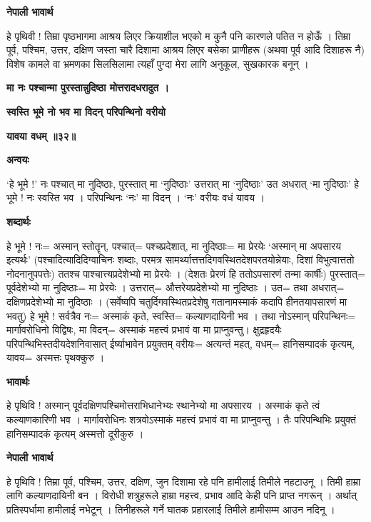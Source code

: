 \documentclass[11pt, a5paper]{article}
\begin{document}
\textbf{नेपाली भावार्थ}

हे पृथिवी ! तिम्रा पृष्ठभागमा आश्रय लिएर क्रियाशील भएको म कुनै पनि कारणले पतित न होऊँ । तिम्रा पूर्व, पश्चिम, उत्तर, दक्षिण जस्ता चारै दिशामा आश्रय लिएर बसेका प्राणीहरू (अथवा पूर्व आदि दिशाहरू नै) विशेष कामले वा भ्रमणका सिलसिलामा त्यहाँ पुग्दा मेरा लागि अनुकूल, सुखकारक बनून् ।

\textbf{मा नः पश्चान्मा पुरस्तान्नुदिष्ठा मोत्तरादधरादुत ।}

\textbf{स्वस्ति भूमे नो भव मा विदन् परिपन्थिनो वरीयो}

\textbf{यावया वधम् ॥३२॥}

\textbf{अन्वयः}

‘हे भूमे !’ नः पश्चात् मा नुदिष्ठाः, पुरस्तात् मा ‘नुदिष्ठाः’ उत्तरात् मा ‘नुदिष्ठाः’ उत अधरात् ‘मा नुदिष्ठाः’ हे भूमे ! नः स्वस्ति भव । परिपन्थिनः ‘नः’ मा विदन् । ‘नः’ वरीयः वधं यावय ।

\textbf{शब्दार्थः}

हे भूमे ! नः= अस्मान् स्तोतॄन्, पश्चात्= पश्चप्रदेशात्, मा नुदिष्ठाः= मा प्रेरयेः ‘अस्मान् मा अपसारय इत्यर्थः’ (पश्चादित्यादिदिग्वाचिनः शब्दाः, परमत्र सामर्थ्यात्तत्तदिगवस्थितदेशपरतयोन्नेयाः,  दिशां विभुत्वात्ततो नोदनानुपपत्तेः) ततश्च पाश्चात्त्यप्रदेशेभ्यो मा प्रेरयेः । (देशतः प्रेरणं हि ततोऽपसारणं तन्मा कार्षीः) पुरस्तात्= पूर्वदेशेभ्यो मा नुदिष्ठाः= मा प्रेरयेः । उत्तरात्= औत्तरेयप्रदेशेभ्यो मा नुदिष्ठाः । उत= तथा अधरात्= दक्षिणप्रदेशेभ्यो मा नुदिष्ठाः । (सर्वेष्वपि चतुर्दिगवस्थितप्रदेशेषु गतानामस्माकं कदापि हीनतयापसारणं मा भवतु) हे भूमे ! सर्वत्रैव नः= अस्माकं कृते, स्वस्ति= कल्याणदायिनी भव । तथा नोऽस्मान् परिपन्थिनः= मार्गावरोधिनो विद्विषः, मा विदन्= अस्माकं महत्त्वं प्रभावं वा मा प्राप्नुवन्तु। क्षुद्रहृदयैः परिपन्थिभिस्तदीयदेशनिवासात् ईर्ष्याभावेन प्रयुक्तम् वरीयः= अत्यन्तं महत्, वधम्= हानिसम्पादकं कृत्यम्, यावय= अस्मत्तः पृथक्‍कुरु ।

\textbf{भावार्थः}

हे पृथिवि ! अस्मान् पूर्वदक्षिणपश्चिमोत्तराभिधानेभ्यः स्थानेभ्यो मा अपसारय । अस्माकं कृते त्वं कल्याणकारिणी भव । मार्गावरोधिनः शत्रवोऽस्माकं महत्त्वं प्रभावं वा मा प्राप्नुवन्तु । तैः परिपन्थिभिः प्रयुक्तं हानिसम्पादकं कृत्यम् अस्मत्तो दूरीकुरु ।

\textbf{नेपाली भावार्थ}

हे पृथिवि ! तिम्रा पूर्व, पश्चिम, उत्तर, दक्षिण, जुन दिशामा रहे पनि हामीलाई तिमीले नहटाउनू । तिमी हाम्रा लागि कल्याणदायिनी बन । विरोधी शत्रुहरूले हाम्रा महत्त्व, प्रभाव आदि केही पनि प्राप्त नगरून् । अर्थात् प्रतिस्पर्धामा हामीलाई नभेटून् । तिनीहरूले गर्ने घातक प्रहारलाई तिमीले हामीसम्म आउन नदिनू ।
\end{document}
